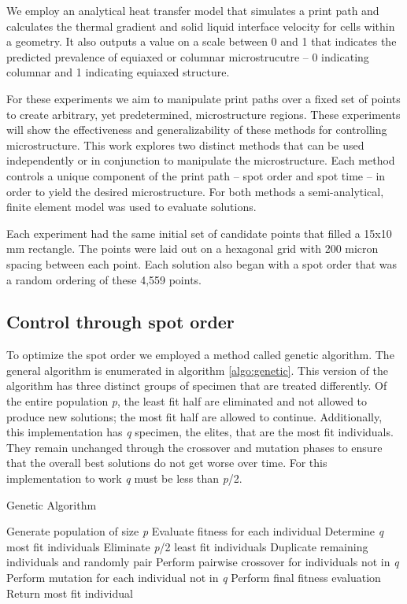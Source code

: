 \documentclass[a4paper]{article}
\begin{document}
We employ an analytical heat transfer model that simulates a print path and calculates the thermal gradient and solid liquid interface velocity for cells within a geometry. It also outputs a value on a scale between 0 and 1 that indicates the predicted prevalence of equiaxed or columnar microstrucutre – 0 indicating columnar and 1 indicating equiaxed structure. 

For these experiments we aim to manipulate print paths over a fixed set of points to create arbitrary, yet predetermined, microstructure regions. These experiments will show the effectiveness and generalizability of these methods for controlling microstructure. This work explores two distinct methods that can be used independently or in conjunction to manipulate the microstructure. Each method controls a unique component of the print path – spot order and spot time – in order to yield the desired microstructure. For both methods a semi-analytical, finite element model was used to evaluate solutions.

Each experiment had the same initial set of candidate points that filled a 15x10 mm rectangle. The points were laid out on a hexagonal grid with 200 micron spacing between each point. Each solution also began with a spot order that was a random ordering of these 4,559 points. 


\subsection{Control through spot order}
\label{subsec:spotorder}

To optimize the spot order we employed a method called genetic algorithm. The general algorithm is enumerated in algorithm \ref{algo:genetic}. This version of the algorithm has three distinct groups of specimen that are treated differently. Of the entire population \textit{p}, the least fit half are eliminated and not allowed to produce new solutions; the most fit half are allowed to continue. Additionally, this implementation has \textit{q} specimen, the elites, that are the most fit individuals. They remain unchanged through the crossover and mutation phases to ensure that the overall best solutions do not get worse over time. For this implementation to work \textit{q} must be less than \textit{p}/2.


\begin{algorithm}
\caption{Genetic Algorithm}
\label{algo:genetic}
\begin{algorithmic}[1]
\State Generate population of size \textit{p}
  \State Evaluate fitness for each individual
  \State Determine \textit{q} most fit individuals
  \State Eliminate \textit{p}/2 least fit individuals
  \State Duplicate remaining individuals and randomly pair
  \State Perform pairwise crossover for individuals not in \textit{q}
  \State Perform mutation for each individual not in \textit{q}
\EndFor
\State Perform final fitness evaluation
\State Return most fit individual
\end{algorithmic}
\end{algorithm}
\end{document}
